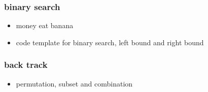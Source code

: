 \documentclass[a4paper,11pt,twoside]{book}
\begin{document}
\subsubsection{binary search}
\begin{itemize}
	\item money eat banana 
	\item code template for binary search, left bound and right bound
\end{itemize}

\subsubsection{back track}
\begin{itemize}
	\item permutation, subset and combination 
\end{itemize}
\end{document}
